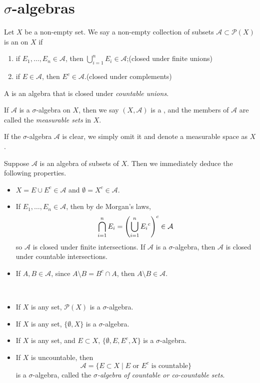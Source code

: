 \section{$\sigma$-algebras}
\begin{definition}\label{defn:sigma-algebra}
Let $X$ be a non-empty set. We say a non-empty collection of subsets $\mathcal{A}\subset\mathcal{P}(X)$ is an  on $X$ if
\begin{enumerate}[label=(\roman*)]
\item if $E_1,\dots,E_n\in\mathcal{A}$, then $\bigcup_{i=1}^{n}E_i\in\mathcal{A}$;\hfill(closed under finite unions)
\item if $E\in\mathcal{A}$, then $E^c\in\mathcal{A}$.\hfill(closed under complements)
\end{enumerate}
A  is an algebra that is closed under \emph{countable unions}.

If $\mathcal{A}$ is a $\sigma$-algebra on $X$, then we say $(X,\mathcal{A})$ is a , and the members of $\mathcal{A}$ are called the \emph{measurable sets} in $X$.
\end{definition}

\begin{notation}
If the $\sigma$-algebra $\mathcal{A}$ is clear, we simply omit it and denote a measurable space as $X$.
\end{notation}

Suppose $\mathcal{A}$ is an algebra of subsets of $X$. Then we immediately deduce the following properties.
\begin{itemize}
\item $X=E\cup E^c\in\mathcal{A}$ and $\emptyset=X^c\in\mathcal{A}$.
\item If $E_1,\dots,E_n\in\mathcal{A}$, then by de Morgan's laws,
\[\bigcap_{i=1}^{n}E_i=\left(\bigcup_{i=1}^{n}{E_i}^c\right)^c\in\mathcal{A}\]
so $\mathcal{A}$ is closed under finite intersections.
If $\mathcal{A}$ is a $\sigma$-algebra, then $\mathcal{A}$ is closed under countable intersections.
\item If $A,B\in\mathcal{A}$, since $A\setminus B=B^c\cap A$, then $A\setminus B\in\mathcal{A}$.
\end{itemize}

\begin{example} \
\begin{itemize}
\item If $X$ is any set, $\mathcal{P}(X)$ is a $\sigma$-algebra.
\item If $X$ is any set, $\{\emptyset,X\}$ is a $\sigma$-algebra.
\item If $X$ is any set, and $E\subset X$, $\{\emptyset,E,E^c,X\}$ is a $\sigma$-algebra.
\item If $X$ is uncountable, then
\[\mathcal{A}=\{E\subset X\mid\text{$E$ or $E^c$ is countable}\}\]
is a $\sigma$-algebra, called the \emph{$\sigma$-algebra of countable or co-countable sets}.
\end{itemize}
\end{example}

